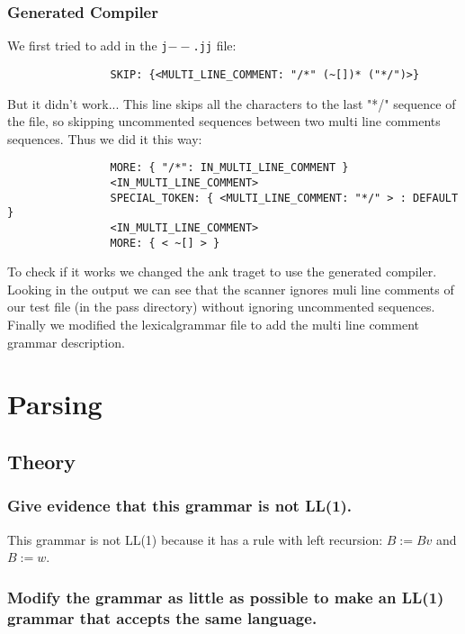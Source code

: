 \documentclass[a4paper, 12pt]{article}
\begin{document}
        \subsubsection{Generated Compiler}
        
            We first tried to add in the \texttt{j$--$.jj} file:
            
            \begin{verbatim}
                SKIP: {<MULTI_LINE_COMMENT: "/*" (~[])* ("*/")>}
            \end{verbatim}
            
            But it didn't work... This line skips all the characters to the last "*/" sequence of the file, so skipping uncommented sequences between two multi line comments sequences. Thus we did it this way:
            
            \begin{verbatim}
                MORE: { "/*": IN_MULTI_LINE_COMMENT }
                <IN_MULTI_LINE_COMMENT>
                SPECIAL_TOKEN: { <MULTI_LINE_COMMENT: "*/" > : DEFAULT }
                <IN_MULTI_LINE_COMMENT>
                MORE: { < ~[] > }
            \end{verbatim} 
            
            To check if it works we changed the ank traget to use the generated compiler. Looking in the output we can see that the scanner ignores muli line comments of our test file (in the pass directory) without ignoring uncommented sequences. Finally we modified the lexicalgrammar file to add the multi line comment grammar description.
           
\section{Parsing}

    \subsection{Theory}
    
        \subsubsection{Give evidence that this grammar is not LL(1).}
        
            This grammar is not LL(1) because it has a rule with left recursion: $B:=Bv$ and $B:=w$.

        \subsubsection{Modify the grammar as little as possible to make an LL(1) grammar that accepts the same language.}
        
\end{document}
